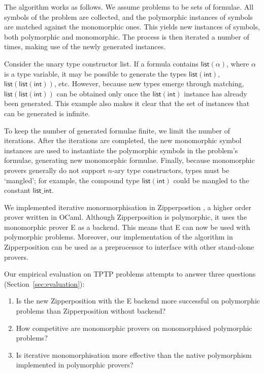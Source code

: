 \documentclass[]{ceurart}
\newcommand\ty[1]{\textsf{#1}}
\begin{document}
The algorithm works as follows. We assume problems to be sets of formulae. All symbols of the problem are collected, and the polymorphic instances of symbols are matched against the monomorphic ones. This yields new instances of symbols, both polymorphic and monomorphic. The process is then iterated
a number of times, making use of the newly generated instances.

Consider the unary type constructor \ty{list}. If a formula contains $\ty{list}(\alpha)$, where $\alpha$ is a type variable, it may be possible to generate the types $\ty{list}(\ty{int})$, $\ty{list}(\ty{list}(\ty{int}))$, etc. However, because new types emerge through matching, $\ty{list}(\ty{list}(\ty{int}))$ can be obtained only once the $\ty{list}(\ty{int})$ instance has already been generated. This example also makes it clear that the set of instances that can be generated is infinite.

To keep the number of generated formulae finite, we limit the number of iterations. After the iterations are completed, the new monomorphic symbol instances are used to instantiate the polymorphic symbols in the problem's formulae, generating new monomorphic formulae. Finally, because monomorphic provers generally do not support $n$-ary type constructors, types must be `mangled'; for example, the compound type $\ty{list}(\ty{int})$ could be mangled to the constant $\ty{list\_int}$.

We implemented iterative monormorphisation in Zipperpostion \cite{zipp}, a higher order prover written in OCaml. Although Zipperposition is polymorphic, it uses the monomorphic prover E \cite{e} as a backend. This means that E can now be used with polymorphic problems. Moreover, our implementation of the algorithm in Zipperposition can be used as a preprocessor to interface with other stand-alone provers.

Our empirical evaluation on TPTP \cite{tptp} problems attempts to answer three questions (Section~\ref{sec:evaluation}):
\begin{enumerate}
\item Is the new Zipperposition with the E backend more successful on polymorphic problems than Zipperposition without backend?

\item How competitive are monomorphic provers on monomorphised polymorphic problems?

\item Is iterative monomorphisation more effective than the native polymorphism implemented in polymorphic provers?
\end{enumerate}
\end{document}
